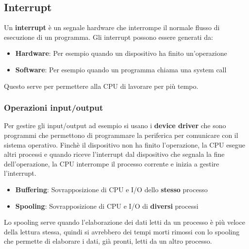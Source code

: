 \documentclass[a4paper]{article}
\begin{document}
\subsection{Interrupt}
Un \textbf{interrupt} è un segnale hardware che interrompe il normale flusso di esecuzione
di un programma. Gli interrupt possono essere generati da:
\begin{itemize}
  \item \textbf{Hardware}: Per esempio quando un dispositivo ha finito un'operazione
  \item \textbf{Software}: Per esempio quando un programma chiama una system call
\end{itemize}
Questo serve per permettere alla CPU di lavorare per più tempo.

\subsubsection{Operazioni input/output}
Per gestire gli input/output
ad esempio si usano i \textbf{device driver} che sono programmi che permettono di
programmare la periferica per comunicare con il sistema operativo. Finchè il dispositivo
non ha finito l'operazione, la CPU esegue altri processi e quando riceve l'interrupt
dal dispositivo che segnala la fine dell'operazione, la CPU interrompe il processo
corrente e inizia a gestire l'interrupt.

\begin{itemize}
  \item \textbf{Buffering}: Sovrapposizione di CPU e I/O dello \textbf{stesso} processo
  \item \textbf{Spooling}: Sovrapposizione di CPU e I/O di \textbf{diversi} processi
\end{itemize}
Lo spooling serve quando l'elaborazione dei dati letti da un processo è più veloce
della lettura stessa, quindi si avrebbero dei tempi morti rimossi con lo spooling che
permette di elaborare i dati, già pronti, letti da un altro processo.
\end{document}
